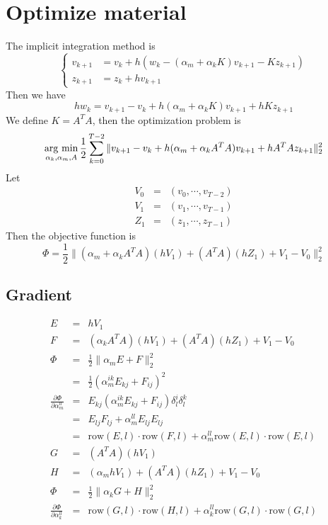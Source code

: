 \documentclass[9pt,twocolumn]{extarticle}
\newcommand{\argmin}{\operatornamewithlimits{arg\ min}}
\begin{document}
\section{Optimize material}
The implicit integration method is
\begin{equation} \label{imp_integ}
  \left\{ \begin{array}{rl}
      v_{k+1} &= v_k + h(w_k-(\alpha_m+\alpha_kK)v_{k+1}-Kz_{k+1})\\
      z_{k+1} &= z_k + h v_{k+1}
    \end{array} \right.
\end{equation}
Then we have
\begin{equation} \label{opt_w_eq}
  hw_k = v_{k+1}-v_k + h (\alpha_m+\alpha_kK)v_{k+1} + hKz_{k+1}
\end{equation}
We define $K=A^TA$, then the optimization problem is
\begin{equation} \label{opt_w}
  \argmin_{\alpha_k,\alpha_m,A} \frac{1}{2}\sum_{k=0}^{T-2}\|v_{k+1}-v_k + h (\alpha_m+\alpha_kA^TA)v_{k+1} + hA^TAz_{k+1}\|_2^2
\end{equation}
Let
\begin{eqnarray}\label{VZ}
 V_0 &=& (v_0,\cdots,v_{T-2}) \nonumber \\
 V_1 &=& (v_1,\cdots,v_{T-1}) \nonumber \\
 Z_1 &=& (z_1,\cdots,z_{T-1}) \nonumber 
\end{eqnarray}
Then the objective function is 
\begin{equation} \label{obj_w}
  \Phi = \frac{1}{2}\| (\alpha_m+\alpha_kA^TA)(hV_1)+(A^TA)(hZ_1)+V_1-V_0\|_2^2
\end{equation}
\subsection{Gradient}
\begin{eqnarray*}
  E &=& hV_1 \\
  F &=& (\alpha_kA^TA)(hV_1) + (A^TA)(hZ_1)+V_1-V_0\\
  \Phi &=& \frac{1}{2}\| \alpha_mE + F \|_2^2 \\
  &=&\frac{1}{2}(\alpha_m^{i{ }k}E_{k{ }j}+F_{i{ }j})^2\\
  \frac{\partial{\Phi}}{\partial{\alpha_m^{l{ }l}}} &=&
  E_{k{ }j}(\alpha_m^{i{ }k}E_{k{ }j}+F_{i{ }j})\delta_l^i\delta_l^k\\
  &=&E_{l{ }j}F_{l{ }j} + \alpha_m^{l{ }l}E_{l{ }j}E_{l{ }j}\\
  &=&\mbox{row}(E,l)\cdot \mbox{row}(F,l) + \alpha_m^{l{ }l}
  \mbox{row}(E,l)\cdot \mbox{row}(E,l)\\
  G &=& (A^TA)(hV_1)\\
  H &=& (\alpha_mhV_1)+(A^TA)(hZ_1)+V_1-V_0\\
  \Phi &=& \frac{1}{2}\|\alpha_kG+H\|_2^2\\
  \frac{\partial{\Phi}}{\partial{\alpha_k^{l{ }l}}} &=&
  \mbox{row}(G,l)\cdot \mbox{row}(H,l) + \alpha_k^{l{ }l}\mbox{row}(G,l)\cdot
  \mbox{row}(G,l)\\
\end{eqnarray*}
\end{document}
